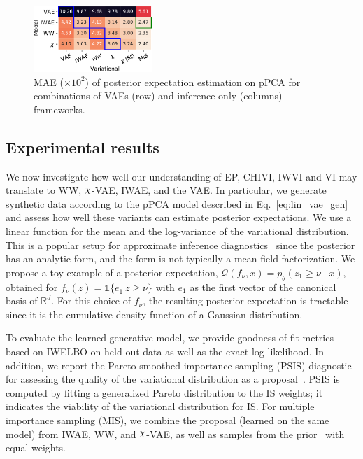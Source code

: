 \begin{figure}
\centering
\captionsetup{type=table}

\end{figure}


\begin{figure}
\centering
\includegraphics[width=0.4\textwidth]{figures/gaussian_l1_is_err_nu_cross.pdf}
\caption[MAE of posterior expectation estimation on pPCA for different methods]{MAE ($\times 10^2$) of posterior expectation estimation on pPCA for combinations of VAEs (row) and inference only (columns) frameworks. }\label{fig:pPCA-cross}
\end{figure}

\subsection{Experimental results}
\label{posterior_query}
We now investigate how well our understanding of EP, CHIVI, IWVI and VI may translate to WW, $\rchi$-VAE, IWAE, and the VAE. In particular, we generate synthetic data according to the pPCA model described in Eq.~\eqref{eq:lin_vae_gen} and assess how well these variants can estimate posterior expectations. We use a linear function for the mean and the log-variance of the variational distribution. This is a popular setup for approximate inference diagnostics~\cite{Turner2011} since the posterior has an analytic form, and the form is not typically a mean-field factorization. We propose a toy example of a posterior expectation, $\mathcal{Q}(f_\nu, x) = p_\theta(z_1 \geq \nu \mid x)$, obtained for $f_\nu(z) = \mathds{1}\{e_1^\top z \geq \nu\}$ with $e_1$ as the first vector of the canonical basis of $\mathbb{R}^d$. For this choice of $f_\nu$, the resulting posterior expectation is tractable since it is the cumulative density function of a Gaussian distribution. 

To evaluate the learned generative model, we provide goodness-of-fit metrics based on IWELBO on held-out data as well as the exact log-likelihood. In addition, we report the Pareto-smoothed importance sampling (PSIS) diagnostic  for assessing the quality of the variational distribution as a proposal~\cite{pmlr-v80-yao18a}. PSIS is computed by fitting a generalized Pareto distribution to the IS weights; it indicates the viability of the variational distribution for IS. For multiple importance sampling (MIS), we combine the proposal (learned on the same model) from IWAE, WW, and $\rchi$-VAE, as well as samples from the prior~\cite{hesterberg1995weighted} with equal weights.

